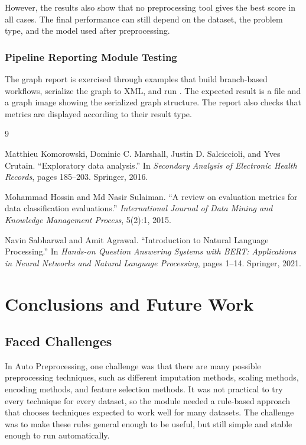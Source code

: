 \documentclass[12pt,a4paper,oneside]{report}
\DeclareRobustCommand{\modulepath}[1]{\path{#1}}
\begin{document}
\noindent However, the results also show that no preprocessing tool gives the best score
in all cases. The final performance can still depend on the dataset, the problem
type, and the model used after preprocessing.


\subsection{Pipeline Reporting Module Testing}

The graph report is exercised through examples that build branch-based
workflows, serialize the graph to XML, and run \modulepath{GraphReport}. The
expected result is a \modulepath{report.html} file and a graph image showing
the serialized graph structure. The report also checks that metrics are displayed
according to their result type.
\renewcommand{\bibname}{Reference}
\begin{thebibliography}{9}

Matthieu Komorowski, Dominic C. Marshall, Justin D. Salciccioli, and Yves
Crutain. ``Exploratory data analysis.'' In \emph{Secondary Analysis of
Electronic Health Records}, pages 185--203. Springer, 2016.

Mohammad Hossin and Md Nasir Sulaiman. ``A review on evaluation metrics for
data classification evaluations.'' \emph{International Journal of Data Mining
and Knowledge Management Process}, 5(2):1, 2015.

Navin Sabharwal and Amit Agrawal. ``Introduction to Natural Language
Processing.'' In \emph{Hands-on Question Answering Systems with BERT:
Applications in Neural Networks and Natural Language Processing}, pages 1--14.
Springer, 2021.

\end{thebibliography}

\chapter{Conclusions and Future Work}
\label{chap:conclusions-future-work}

\section{Faced Challenges}

\noindent In Auto Preprocessing, one challenge was that there are many possible
preprocessing techniques, such as different imputation methods, scaling methods,
encoding methods, and feature selection methods. It was not practical to try
every technique for every dataset, so the module needed a rule-based approach
that chooses techniques expected to work well for many datasets. The challenge
was to make these rules general enough to be useful, but still simple and stable
enough to run automatically.
\end{document}
